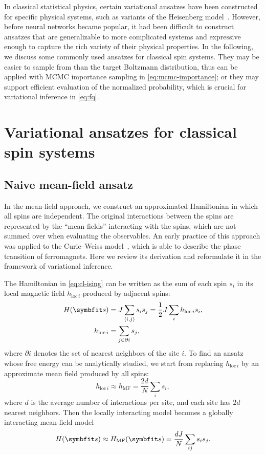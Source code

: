 In classical statistical physics, certain variational ansatzes have been constructed for specific physical systems, such as variants of the Heisenberg model~\cite{tsallis1976classical, castro2007free, carvalho2012variational}. However, before neural networks became popular, it had been difficult to construct ansatzes that are generalizable to more complicated systems and expressive enough to capture the rich variety of their physical properties. In the following, we discuss some commonly used ansatzes for classical spin systems. They may be easier to sample from than the target Boltzmann distribution, thus can be applied with MCMC importance sampling in \cref{eq:mcmc-importance}; or they may support efficient evaluation of the normalized probability, which is crucial for variational inference in \cref{eq:fq}.

\section{Variational ansatzes for classical spin systems}

\subsection{Naive mean-field ansatz}
\label{sec:nmf}

In the mean-field approach, we construct an approximated Hamiltonian in which all spins are independent. The original interactions between the spins are represented by the ``mean fields'' interacting with the spins, which are not summed over when evaluating the observables. An early practice of this approach was applied to the Curie--Weiss model~\cite{weiss1907hypothese}, which is able to describe the phase transition of ferromagnets. Here we review its derivation and reformulate it in the framework of variational inference.

The Hamiltonian in \cref{eq:cl-ising} can be written as the sum of each spin $s_i$ in its local magnetic field $h_{\text{loc}\,i}$ produced by adjacent spins:
\begin{align}
H(\vs) &= J \sum_{\langle i, j \rangle} s_i s_j
= \frac{1}{2} J \sum_i h_{\text{loc}\,i} s_i, \\
h_{\text{loc}\,i} &= \sum_{j \in \partial i} s_j,
\end{align}
where $\partial i$ denotes the set of nearest neighbors of the site $i$. To find an ansatz whose free energy can be analytically studied, we start from replacing $h_{\text{loc}\,i}$ by an approximate mean field produced by all spins:
\begin{equation}
h_{\text{loc}\,i} \approx h_\text{MF} = \frac{2 d}{N} \sum_i s_i,
\end{equation}
where $d$ is the average number of interactions per site, and each site has $2 d$ nearest neighbors. Then the locally interacting model becomes a globally interacting mean-field model
\begin{equation}
H(\vs) \approx H_\text{MF}(\vs) = \frac{d J}{N} \sum_{i j} s_i s_j.
\label{eq:ham-mf}
\end{equation}

